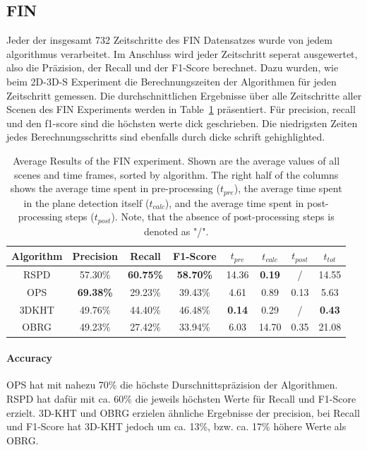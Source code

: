 \documentclass[main.tex]{subfiles}
\begin{document}
\subsection{FIN}
Jeder der insgesamt 732 Zeitschritte des FIN Datensatzes wurde von jedem algorithmus verarbeitet. Im Anschluss wird
jeder Zeitschritt seperat ausgewertet, also die Präzision, der Recall und der F1-Score berechnet. Dazu
wurden, wie beim 2D-3D-S Experiment die Berechnungszeiten der Algorithmen für jeden Zeitschritt gemessen.
Die durchschnittlichen Ergebnisse über alle Zeitschritte aller Scenen des FIN Experiments werden
in Table~\ref{tab:res-fin-total} präsentiert. Für precision, recall und den f1-score sind die höchsten werte dick geschrieben.
Die niedrigsten Zeiten jedes Berechnungsschritts sind ebenfalls durch dicke schrift gehighlighted.


\begin{table}[H]
    \centering
    \begin{tabular}{c|cccccc|c}
        Algorithm & Precision        & Recall           & F1-Score         & $t_{pre}$     & $t_{calc}$    & $t_{post}$ & $t_{tot}$     \\ \hline
        RSPD      & 57.30\%          & \textbf{60.75\%} & \textbf{58.70\%} & 14.36         & \textbf{0.19} & /          & 14.55         \\
        OPS       & \textbf{69.38\%} & 29.23\%          & 39.43\%          & 4.61          & 0.89          & 0.13       & 5.63          \\
        3DKHT     & 49.76\%          & 44.40\%          & 46.48\%          & \textbf{0.14} & 0.29          & /          & \textbf{0.43} \\
        OBRG      & 49.23\%          & 27.42\%          & 33.94\%          & 6.03          & 14.70         & 0.35       & 21.08
    \end{tabular}
    \caption[Average FIN Results]{Average Results of the FIN experiment. Shown are the average values of all scenes and time frames, sorted by
        algorithm. The right half of the columns shows the average time spent in pre-processing ($t_{pre}$), the average time spent in the plane
        detection itself ($t_{calc}$), and the average time spent in post-processing steps ($t_{post}$).
        Note, that the absence of post-processing steps is denoted as "/".}
    \label{tab:res-fin-total}
\end{table}

\paragraph{Accuracy}
OPS hat mit nahezu 70\% die höchste Durschnittspräzision der Algorithmen. RSPD hat dafür mit ca. 60\% die jeweils höchsten
Werte für Recall und F1-Score erzielt. 3D-KHT und OBRG erzielen ähnliche Ergebnisse der precision, bei Recall und
F1-Score hat 3D-KHT jedoch um ca. 13\%, bzw. ca. 17\% höhere Werte als OBRG.
\end{document}
